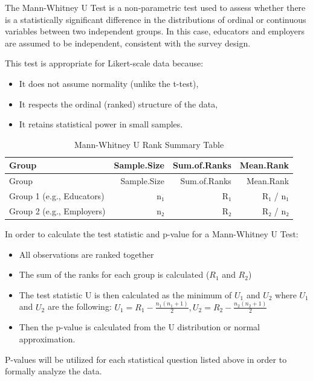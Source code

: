 \documentclass[
  11pt,
  letterpaper,
  DIV=11,
  numbers=noendperiod]{scrartcl}
\providecommand{\tightlist}{%
  \setlength{\itemsep}{0pt}\setlength{\parskip}{0pt}}
\numberwithin{figure}{section}
\begin{document}
The Mann-Whitney U Test is a non-parametric test used to assess whether
there is a statistically significant difference in the distributions of
ordinal or continuous variables between two independent groups. In this
case, educators and employers are assumed to be independent, consistent
with the survey design.

This test is appropriate for Likert-scale data because:

\begin{itemize}
\tightlist
\item
  It does not assume normality (unlike the t-test),
\item
  It respects the ordinal (ranked) structure of the data,
\item
  It retains statistical power in small samples.
\end{itemize}

\begin{longtable}[]{@{}lrrr@{}}
\caption{Mann-Whitney U Rank Summary Table}\tabularnewline
\toprule\noalign{}
Group & Sample.Size & Sum.of.Ranks & Mean.Rank \\
\midrule\noalign{}
\endfirsthead
\toprule\noalign{}
Group & Sample.Size & Sum.of.Ranks & Mean.Rank \\
\midrule\noalign{}
\endhead
\bottomrule\noalign{}
\endlastfoot
Group 1 (e.g., Educators) & n₁ & R₁ & R₁ / n₁ \\
Group 2 (e.g., Employers) & n₂ & R₂ & R₂ / n₂ \\
\end{longtable}

In order to calculate the test statistic and p-value for a Mann-Whitney
U Test:

\begin{itemize}
\tightlist
\item
  All observations are ranked together
\item
  The sum of the ranks for each group is calculated (\(R_1\) and
  \(R_2\))
\item
  The test statistic U is then calculated as the minimum of \(U_1\) and
  \(U_2\) where \(U_1\) and \(U_2\) are the following:
  \(U_1 = R_1 - \frac{n_1(n_1 + 1)}{2},  U_2 = R_2 - \frac{n_2(n_2 + 1)}{2}\)
\item
  Then the p-value is calculated from the U distribution or normal
  approximation.
\end{itemize}

P-values will be utilized for each statistical question listed above in
order to formally analyze the data.
\end{document}
